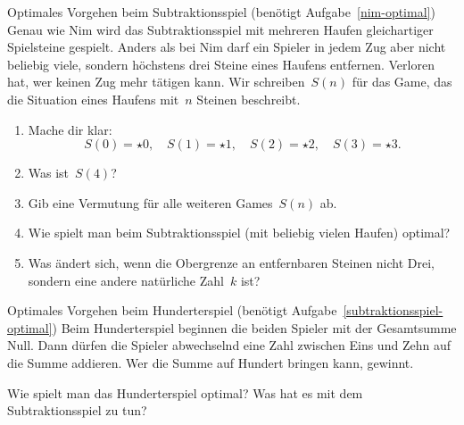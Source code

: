 \documentclass{../zirkelblatt}
\begin{document}
\begin{aufgabe}{Optimales Vorgehen beim Subtraktionsspiel
(benötigt Aufgabe~\ref{nim-optimal})}
\label{subtraktionsspiel-optimal}
Genau wie Nim wird das Subtraktionsspiel mit mehreren Haufen gleichartiger
Spielsteine gespielt. Anders als bei Nim darf ein Spieler in jedem Zug aber
nicht beliebig viele, sondern höchstens drei Steine eines Haufens
entfernen. Verloren hat, wer keinen Zug mehr tätigen kann.
Wir schreiben~$S(n)$ für das Game, das die Situation eines Haufens mit~$n$
Steinen beschreibt.
\begin{enumerate}
\item Mache dir klar:
\[ S(0) = \star0, \quad S(1) = \star1, \quad S(2) = \star2, \quad
  S(3) = \star3. \]
\item Was ist~$S(4)$?
\item Gib eine Vermutung für alle weiteren Games~$S(n)$ ab.
\item Wie spielt man beim Subtraktionsspiel (mit beliebig vielen Haufen)
optimal?
\item Was ändert sich, wenn die Obergrenze an entfernbaren Steinen nicht Drei,
sondern eine andere natürliche Zahl~$k$ ist?
\end{enumerate}
\end{aufgabe}

\begin{aufgabe}{Optimales Vorgehen beim Hunderterspiel
(benötigt Aufgabe~\ref{subtraktionsspiel-optimal})}
Beim Hunderterspiel beginnen die beiden Spieler mit der Gesamtsumme Null. Dann
dürfen die Spieler abwechselnd eine Zahl zwischen Eins und Zehn auf die Summe
addieren. Wer die Summe auf Hundert bringen kann, gewinnt.

Wie spielt man das Hunderterspiel optimal? Was hat es mit dem Subtraktionsspiel
zu tun?
\end{aufgabe}
\end{document}
